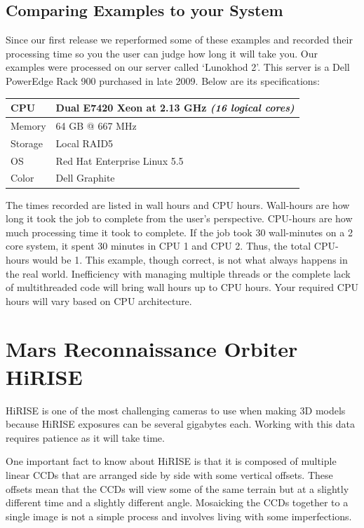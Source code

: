 \subsection{Comparing Examples to your System}

Since our first release we reperformed some of these examples and
recorded their processing time so you the user can judge how long it
will take you. Our examples were processed on our server called
`Lunokhod 2'. This server is a Dell PowerEdge Rack 900 purchased in
late 2009. Below are its specifications:

\begin{center}
\begin{tabular}{ l | l }
CPU & Dual E7420 Xeon at 2.13 GHz \emph{(16 logical cores)} \\ \hline
Memory & 64 GB @ 667 MHz \\ \hline
Storage & Local RAID5 \\ \hline
OS & Red Hat Enterprise Linux 5.5 \\ \hline
Color & Dell Graphite \\
\end{tabular}
\end{center}

The times recorded are listed in wall hours and CPU hours. Wall-hours
are how long it took the job to complete from the user's
perspective. CPU-hours are how much processing time it took to
complete. If the job took 30 wall-minutes on a 2 core system, it spent
30 minutes in CPU 1 and CPU 2. Thus, the total CPU-hours would be
1. This example, though correct, is not what always happens in the
real world. Inefficiency with managing multiple threads or the
complete lack of multithreaded code will bring wall hours up to CPU
hours. Your required CPU hours will vary based on CPU architecture.

\section{Mars Reconnaissance Orbiter HiRISE}

\ac{HiRISE} is one of the most challenging cameras to use when making 3D
models because \ac{HiRISE} exposures can be several gigabytes each. Working
with this data requires patience as it will take time.

One important fact to know about HiRISE is that it is composed of
multiple linear CCDs that are arranged side by side with some vertical
offsets. These offsets mean that the CCDs will view some of the same
terrain but at a slightly different time and a slightly different
angle. Mosaicking the CCDs together to a single image is not a simple
process and involves living with some imperfections.

